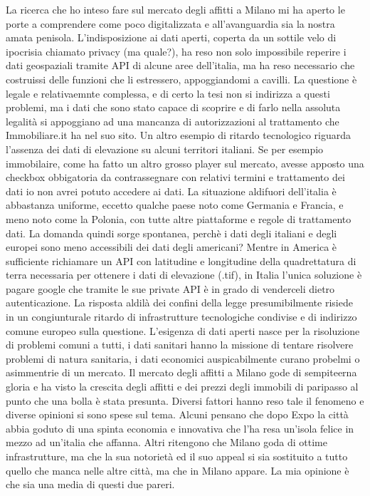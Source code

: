 \documentclass[
  12pt,
  a4paper,
  oneside]{book}
\begin{document}
La ricerca che ho inteso fare sul mercato degli affitti a Milano mi ha aperto le porte a comprendere come poco digitalizzata e all'avanguardia sia la nostra amata penisola. L'indisposizione ai dati aperti, coperta da un sottile velo di ipocrisia chiamato privacy (ma quale?), ha reso non solo impossibile reperire i dati geospaziali tramite API di alcune aree dell'italia, ma ha reso necessario che costruissi delle funzioni che li estressero, appoggiandomi a cavilli. La questione è legale e relativaemnte complessa, e di certo la tesi non si indirizza a questi problemi, ma i dati che sono stato capace di scoprire e di farlo nella assoluta legalità si appoggiano ad una mancanza di autorizzazioni al trattamento che Immobiliare.it ha nel suo sito.
Un altro esempio di ritardo tecnologico riguarda l'assenza dei dati di elevazione su alcuni territori italiani.
Se per esempio immobilaire, come ha fatto un altro grosso player sul mercato, avesse apposto una checkbox obbigatoria da contrassegnare con relativi termini e trattamento dei dati io non avrei potuto accedere ai dati. La situazione aldifuori dell'italia è abbastanza uniforme, eccetto qualche paese noto come Germania e Francia, e meno noto come la Polonia, con tutte altre piattaforme e regole di trattamento dati. La domanda quindi sorge spontanea, perchè i dati degli italiani e degli europei sono meno accessibili dei dati degli americani?
Mentre in America è sufficiente richiamare un API con latitudine e longitudine della quadrettatura di terra necessaria per ottenere i dati di elevazione (.tif), in Italia l'unica soluzione è pagare google che tramite le sue private API è in grado di venderceli dietro autenticazione.
La risposta aldilà dei confini della legge presumibilmente risiede in un congiunturale ritardo di infrastrutture tecnologiche condivise e di indirizzo comune europeo sulla questione.
L'esigenza di dati aperti nasce per la risoluzione di problemi comuni a tutti, i dati sanitari hanno la missione di tentare risolvere problemi di natura sanitaria, i dati economici auspicabilmente curano probelmi o asimmentrie di un mercato. Il mercato degli affitti a Milano gode di sempiteerna gloria e ha visto la crescita degli affitti e dei prezzi degli immobili di paripasso al punto che una bolla è stata presunta. Diversi fattori hanno reso tale il fenomeno e diverse opinioni si sono spese sul tema. Alcuni pensano che dopo Expo la città abbia goduto di una spinta economia e innovativa che l'ha resa un'isola felice in mezzo ad un'italia che affanna. Altri ritengono che Milano goda di ottime infrastrutture, ma che la sua notorietà ed il suo appeal si sia sostituito a tutto quello che manca nelle altre città, ma che in Milano appare. La mia opinione è che sia una media di questi due pareri.
\end{document}
